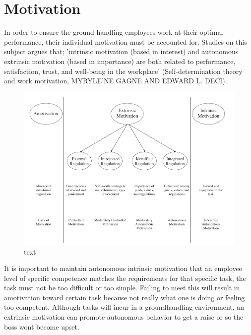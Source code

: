 \section{Motivation}

In order to ensure the ground-handling employees work at their optimal performance, their individual motivation must be accounted for. Studies on this subject argues that; 'intrinsic motivation (based in interest) and autonomous extrinsic motivation (based in importance) are both related to performance, satisfaction, trust, and well-being in the workplace'
(Self-determination theory and work motivation, MYRYLE'NE GAGNE AND EDWARD L. DECI).

\begin{figure}
\centering
\includegraphics[width=\textwidth]{Grafik/Motivation}
\caption{text}
\label{STOOAAP}
\end{figure}

It is important to maintain autonomous intrinsic motivation that an employee level of specific competence matches the requirements for that specific task, the task must not be too difficult or too simple. Failing to meet this will result in amotivation toward certain task because not really what one is doing or feeling too competent. Although tasks will incur in a groundhandling environment, an extrinsic motivation can promote autonomous behavior to get a raise or so the boss wont become upset.

